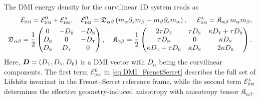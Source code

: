 \documentclass[runningheads]{llncs}
\begin{document}
The DMI energy density for the curvilinear 1D system reads as~\cite{Volkov18}
\begin{equation}\label{eq:DMI_FrenetSerret}
\begin{split}
\mathcal{E}_\textsc{dm}=\mathcal{E}_\textsc{dm}^0+\mathcal{E}_\textsc{dm}^\textsc{a},\quad \mathcal{E}_\textsc{dm}^0=\mathfrak{D}_{\alpha\beta}\left(m_\alpha \partial_s m_\beta-m_\beta\partial_s m_\alpha\right),\ \quad \mathcal{E}_\textsc{dm}^\textsc{a}=\mathfrak{K}_{\alpha\beta}\,m_\alpha m_\beta,\\
\mathfrak{D}_{\alpha\beta}=\frac{1}{2}\left(\begin{matrix}
0 & -D_\textsc{b} & -D_\textsc{n}\\
D_\textsc{b} & 0 & -D_\textsc{t}\\
D_\textsc{n} & D_\textsc{t} & 0
\end{matrix}\right),\quad \mathfrak{K}_{\alpha\beta}=\frac{1}{2}\left(\begin{matrix}
2\tau D_\textsc{t} & \tau D_\textsc{n} & \kappa D_\textsc{t} + \tau D_\textsc{b}\\
\tau D_\textsc{n} & 0 & \kappa D_\textsc{n}\\
\kappa D_\textsc{t} + \tau D_\textsc{b} & \kappa D_\textsc{n} & 2\kappa D_\textsc{b}
\end{matrix}\right).
\end{split}
\end{equation}
Here, $\vec{D}=\left(D_\textsc{t},D_\textsc{n},D_\textsc{b}\right)$ is a DMI vector with $D_\alpha$ being the curvilinear components. The first term $\mathcal{E}_\textsc{dm}^0$ in \eqref{eq:DMI_FrenetSerret} describes the full set of Lifshitz invariant in the Frenet--Serret reference frame, while the second term $\mathcal{E}_\textsc{dm}^\textsc{a}$ determines the effective geometry-induced anisotropy with anisotropy tensor $\mathfrak{K}_{\alpha\beta}$.
\end{document}
